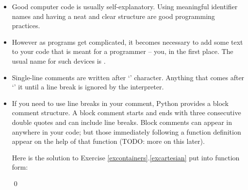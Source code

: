 \documentclass[a4paper]{article}
\begin{document}
\begin{itemize}

\item Good computer code is usually self-explanatory. Using meaningful identifier
names and having a neat and clear structure are good programming practices. 

\item However as programs get complicated, it becomes necessary to add some text
to your  code that is meant for a programmer -- you, in the first place. The
usual name for such devices is .

\item Single-line comments are written after `\pyv{#}' character.
Anything that comes after `\pyv{#}' it until a line break is ignored by the interpreter.

\begin{ucodeframe}
\end{ucodeframe}

\item If you need to use line breaks in your comment, Python provides a block
comment structure. A block comment starts and ends with three consecutive
double quotes and can include line breaks. Block comments can appear in anywhere
in your code; but those immediately following a function definition appear on
the help of that function (TODO: more on this later). 

\begin{ucode}
Here is the solution to
Exercise \ref{excontainers}.\ref{excartesian} put into function form:
\begin{ucodeframe}
\end{ucodeframe}

\qed
\end{ucode}


\end{itemize}
\end{document}

